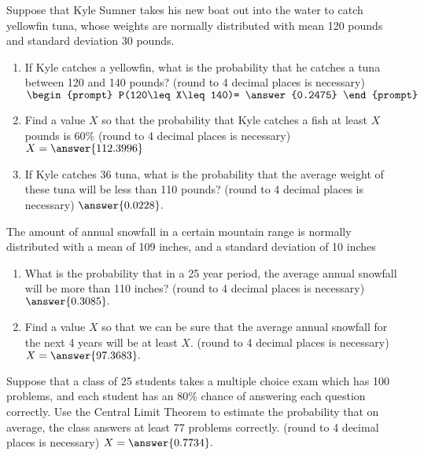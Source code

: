 \documentclass{ximera}
\begin{document}
\begin{problem}
Suppose that Kyle Sumner takes his new boat out into the water to catch yellowfin tuna, whose weights are normally distributed with mean 120 pounds and standard deviation 30 pounds.  

\begin{enumerate}
\item If Kyle catches a yellowfin, what is the probability that he catches a tuna between 120 and 140 pounds? (round to 4 decimal places is necessary) $\begin{prompt}
    P(120\leq X\leq 140)= \answer{0.2475}
  \end{prompt}$ 
  \item  Find a value $X$ so that the probability that Kyle catches a fish at least $X$ pounds is 60\% (round to 4 decimal places is necessary) $X=\answer{112.3996}$
  \item If Kyle catches 36 tuna, what is the probability that the average weight of these tuna will be less than 110 pounds? (round to 4 decimal places is necessary) $\answer{0.0228}.$

\end{enumerate}
\end{problem}


\begin{problem}
The amount of annual snowfall in a certain mountain range is normally distributed with a mean of 109 inches, and a standard deviation of 10 inches
\begin{enumerate}
\item What is the probability that in a 25 year period, the average annual snowfall will be more than 110 inches? (round to 4 decimal places is necessary) $\answer{0.3085}.$

\item Find a value $X$ so that we can be sure that the average annual snowfall for the next 4 years will be at least $X$. (round to 4 decimal places is necessary) $X=\answer{97.3683}.$

\end{enumerate}


\end{problem}

\begin{problem}
Suppose that a class of 25 students takes a multiple choice exam which has 100 problems, and each student has an 80\% chance of answering each question correctly.  Use the Central Limit Theorem to estimate the probability that on average, the class answers at least 77 problems correctly. (round to 4 decimal places is necessary) $X=\answer{0.7734}.$



\end{problem}









 
 
 
 
      
\end{document}
